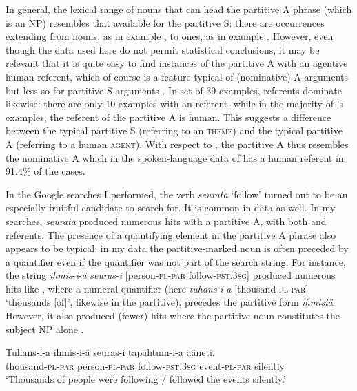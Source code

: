 \documentclass[output=paper]{LSP/langsci}
\begin{document}
In general, the lexical range of nouns that can head the partitive A phrase (which is an NP) resembles that available for the partitive S: there are occurrences extending from  nouns, as in example , to  ones, as in example . However, even though the data used here do not permit statistical conclusions, it may be relevant that it is quite easy to find instances of the partitive A with an agentive human referent, which of course is a feature typical of (nominative) A arguments but less so for partitive S arguments . In  set of 39 examples,  referents dominate likewise: there are only 10 examples with an  referent, while in the majority of \citeauthor{Yli-Vakkuri1979Partitiivisubjektin}’s examples, the referent of the partitive A is human. This suggests a difference between the typical partitive S (referring to an  \textsc{theme}) and the typical partitive A (referring to a human \textsc{agent}). With respect to , the partitive A thus resembles the nominative A which in the spoken-language data of \citet[92]{Helasvuo2001Syntax} has a human referent in 91.4\% of the cases. 

In the Google searches I performed, the verb \textit{seurata} ‘follow’ turned out to be an especially fruitful candidate to search for. It is common in  data as well. In my searches, \textit{seurata} produced numerous hits with a partitive A, with both  and  referents. The presence of a quantifying element in the partitive A phrase also appears to be typical: in my data the partitive-marked noun is often preceded by a quantifier even if the quantifier was not part of the search string. For instance, the string \textit{ihmis}-\textit{i}-\textit{ä} \textit{seuras}-\textit{i} [person-\textsc{pl}-\textsc{par} follow-\textsc{pst.3sg}] produced numerous hits like , where a numeral quantifier (here \textit{tuhans}-\textit{i}-\textit{a} [thousand-\textsc{pl}-\textsc{par}] ‘thousands [of]’, likewise in the partitive), precedes the partitive form \textit{ihmisiä}. However, it also produced (fewer) hits where the partitive noun constitutes the subject NP alone . 

\ea\label{15-hu-ex:11}
\gll Tuhans-i-a ihmis-i-ä seuras-i tapahtum-i-a ääneti.\\
thousand-\textsc{pl}-\textsc{par} person-\textsc{pl}-\textsc{par} follow-\textsc{pst}.\textsc{3sg} event-\textsc{pl}-\textsc{par} silently\\
\glt `Thousands of people were following / followed the events silently.’ %
\z
\end{document}
